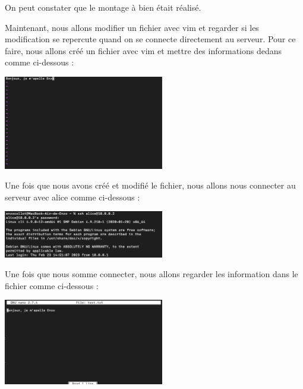 \documentclass[12pt]{article}
\begin{document}
On peut constater que le montage à bien était réalisé. 

\newpage

\vspace{0.3cm}

Maintenant, nous allons modifier un fichier avec vim et regarder si les modification se repercute quand on se connecte directement au serveur. Pour ce faire, nous allons créé un fichier avec vim et mettre des informations dedans comme ci-dessous  : 

\vspace{0.3cm}

\begin{center}
  \includegraphics[width=7cm]{Image-TD-SSH-4/Modification-fichier-vim.png}
\end{center}

\vspace{0.3cm}

Une fois que nous avons créé et modifié le fichier, nous allons nous connecter au serveur avec alice comme ci-dessous : 

\vspace{0.3cm}

\begin{center}
  \includegraphics[width=7cm]{Image-TD-SSH-4/connexion-ssh.png}
\end{center}

\vspace{0.3cm}

Une fois que nous somme connecter, nous allons regarder les information dans le fichier comme ci-dessous  : 


\vspace{0.3cm}

\begin{center}
  \includegraphics[width=7cm]{Image-TD-SSH-4/verfication-fichier.png}
\end{center}
\end{document}
